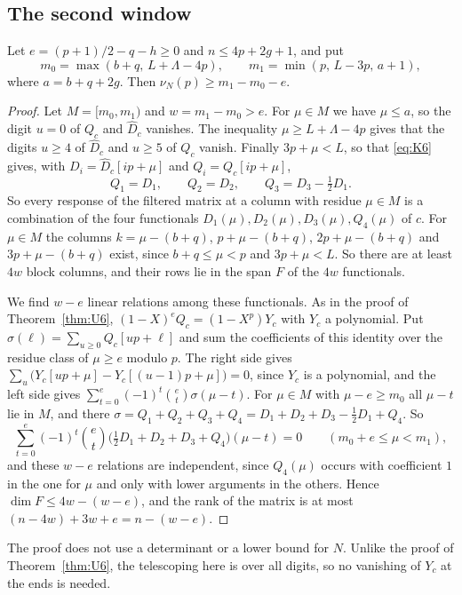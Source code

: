\subsection{The second window}
\begin{theorem}\label{thm:S}
Let $e=(p+1)/2-q-h\ge0$ and $n\le4p+2g+1$, and put
\[
 m_0=\max(b+q,\,L+\Lambda-4p),\qquad m_1=\min(p,\,L-3p,\,a+1),
\]
where $a=b+q+2g$. Then $\nu_N(p)\ge m_1-m_0-e$.
\end{theorem}

\begin{proof}
Let $M=[m_0,m_1)$ and $w=m_1-m_0>e$. For $\mu\in M$ we have $\mu\le a$, so the digit $u=0$ of $Q_c$ and
$\widehat D_c$ vanishes. The inequality $\mu\ge L+\Lambda-4p$ gives that the digits $u\ge4$ of $\widehat D_c$
and $u\ge5$ of $Q_c$ vanish. Finally $3p+\mu<L$, so that \eqref{eq:K6} gives, with $D_i=\widehat D_c[ip+\mu]$ and
$Q_i=Q_c[ip+\mu]$,
\[
 Q_1=D_1,\qquad Q_2=D_2,\qquad Q_3=D_3-\tfrac12D_1 .
\]
So every response of the filtered matrix at a column with residue $\mu\in M$ is a combination of the four
functionals $D_1(\mu),D_2(\mu),D_3(\mu),Q_4(\mu)$ of $c$. For $\mu\in M$ the columns $k=\mu-(b+q)$,
$p+\mu-(b+q)$, $2p+\mu-(b+q)$ and $3p+\mu-(b+q)$ exist, since $b+q\le\mu<p$ and $3p+\mu<L$. So there are at least
$4w$ block columns, and their rows lie in the span $F$ of the $4w$ functionals.

We find $w-e$ linear relations among these functionals. As in the proof of Theorem~\ref{thm:U6},
$(1-X)^eQ_c=(1-X^p)Y_c$ with $Y_c$ a polynomial. Put $\sigma(\ell)=\sum_{u\ge0}Q_c[up+\ell]$ and sum the
coefficients of this identity over the residue class of $\mu\ge e$ modulo $p$. The right side gives
$\sum_u\bigl(Y_c[up+\mu]-Y_c[(u-1)p+\mu]\bigr)=0$, since $Y_c$ is a polynomial, and the left side gives
$\sum_{t=0}^e(-1)^t\binom et\sigma(\mu-t)$. For $\mu\in M$ with $\mu-e\ge m_0$ all $\mu-t$ lie in $M$, and there
$\sigma=Q_1+Q_2+Q_3+Q_4=D_1+D_2+D_3-\tfrac12D_1+Q_4$. So
\[
 \sum_{t=0}^e(-1)^t\binom et\bigl(\tfrac12D_1+D_2+D_3+Q_4\bigr)(\mu-t)=0\qquad(m_0+e\le\mu<m_1),
\]
and these $w-e$ relations are independent, since $Q_4(\mu)$ occurs with coefficient $1$ in the one for $\mu$
and only with lower arguments in the others. Hence $\dim F\le4w-(w-e)$, and the rank of the matrix is at most
$(n-4w)+3w+e=n-(w-e)$.
\end{proof}

The proof does not use a determinant or a lower bound for $N$. Unlike the proof of Theorem~\ref{thm:U6}, the
telescoping here is over all digits, so no vanishing of $Y_c$ at the ends is needed.

